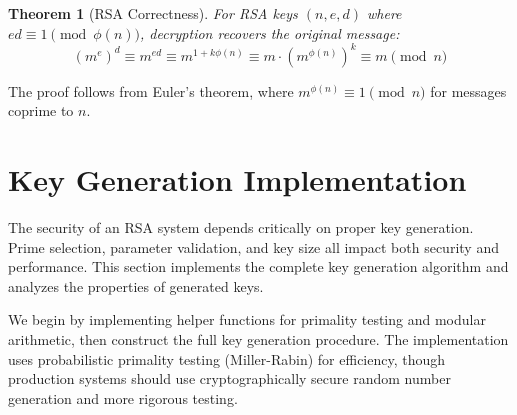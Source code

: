 \documentclass[a4paper, 11pt]{article}
\newtheorem{theorem}{Theorem}[section]
\begin{document}
\begin{theorem}[RSA Correctness]
For RSA keys $(n, e, d)$ where $ed \equiv 1 \pmod{\phi(n)}$, decryption recovers the
original message:
\begin{equation}
(m^e)^d \equiv m^{ed} \equiv m^{1 + k\phi(n)} \equiv m \cdot (m^{\phi(n)})^k \equiv m \pmod{n}
\end{equation}
\end{theorem}

The proof follows from Euler's theorem, where $m^{\phi(n)} \equiv 1 \pmod{n}$ for messages
coprime to $n$.

\section{Key Generation Implementation}

The security of an RSA system depends critically on proper key generation. Prime selection,
parameter validation, and key size all impact both security and performance. This section
implements the complete key generation algorithm and analyzes the properties of generated
keys.

We begin by implementing helper functions for primality testing and modular arithmetic, then
construct the full key generation procedure. The implementation uses probabilistic primality
testing (Miller-Rabin) for efficiency, though production systems should use cryptographically
secure random number generation and more rigorous testing.
\end{document}
